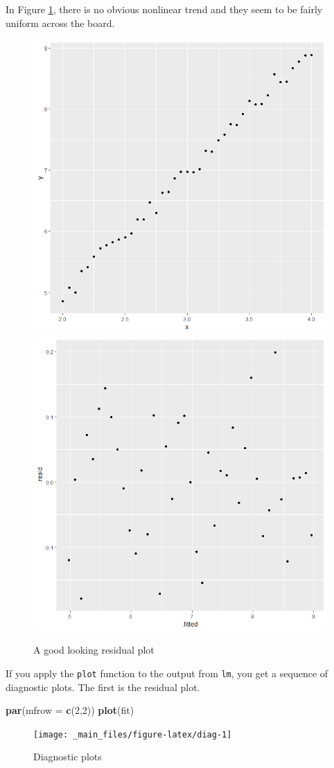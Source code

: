 \documentclass[
]{book}
\newenvironment{Shaded}{\begin{snugshade}}{\end{snugshade}}
\newcommand{\AttributeTok}[1]{\textcolor[rgb]{0.13,0.29,0.53}{#1}}
\newcommand{\DecValTok}[1]{\textcolor[rgb]{0.00,0.00,0.81}{#1}}
\newcommand{\FunctionTok}[1]{\textcolor[rgb]{0.13,0.29,0.53}{\textbf{#1}}}
\newcommand{\NormalTok}[1]{#1}
\theoremstyle{definition}
\theoremstyle{definition}
\theoremstyle{definition}
\theoremstyle{definition}
\theoremstyle{remark}
\begin{document}
In Figure \ref{fig:assumptionsmet}, there is no obvious nonlinear trend and they seem to be fairly uniform across the board.

\begin{figure}

{\centering \includegraphics[width=0.4\linewidth]{images/rp3} \includegraphics[width=0.4\linewidth]{images/rp3a} 

}

\caption{A good looking residual plot}\label{fig:assumptionsmet}
\end{figure}

If you apply the \texttt{plot} function to the output from \texttt{lm}, you get a sequence of diagnostic plots. The first is the residual plot.

\begin{Shaded}
\begin{Highlighting}[]
\FunctionTok{par}\NormalTok{(}\AttributeTok{mfrow =} \FunctionTok{c}\NormalTok{(}\DecValTok{2}\NormalTok{,}\DecValTok{2}\NormalTok{))}
\FunctionTok{plot}\NormalTok{(fit)}
\end{Highlighting}
\end{Shaded}

\begin{figure}

{\centering \texttt{[image: \_main\_files/figure-latex/diag-1]} 

}

\caption{Diagnostic plots}\label{fig:diag}
\end{figure}
\end{document}
